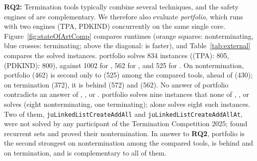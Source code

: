 \textbf{RQ2:} Termination tools typically combine several techniques,
and the safety engines of \golem are complementary.
We therefore also evaluate \emph{\snaOpt portfolio}, which runs \snaOpt with two engines
(TPA, PDKIND) concurrently on the same single core.
Figure~\ref{fig:stateOfArtComp} compares runtimes (orange squares: nonterminating, blue crosses: terminating;
above the diagonal: \snaOpt is faster), and Table~\ref{tab:external} compares the solved instances.
\snaOpt portfolio solves 834 instances (\snaOpt (TPA): 805, \snaOpt (PDKIND): 800), against 1002 for \Tt, 562 for \KoAT, and 525 for \LoAT.
On nontermination, \snaOpt portfolio (462) is second only to \LoAT (525) among the compared tools, ahead of \Tt (430);
on termination (372), it is behind \Tt (572) and \KoAT (562).
No answer of \snaOpt portfolio contradicts an answer of \LoAT, \KoAT, or \Tt.
\snaOpt portfolio solves nine instances that none of \LoAT, \KoAT, or \Tt solves (eight nonterminating, one terminating);
\snaOpt alone solves eight such instances.
Two of them, \texttt{juLinkedListCreateAddAll} and \texttt{juLinkedListCreateAddAllAt},
were not solved by any participant of the Termination Competition 2025; \snaOpt found recurrent sets and proved their nontermination.
In answer to \textbf{RQ2}, \snaOpt portfolio is the second strongest on nontermination among the compared tools,
is behind \Tt and \KoAT on termination, and is complementary to all of them.
